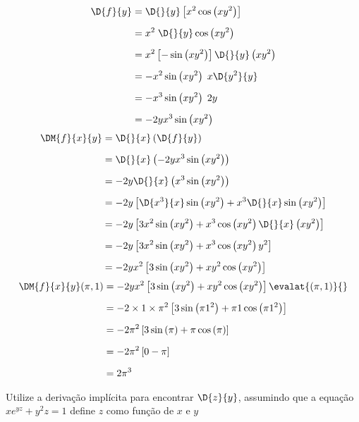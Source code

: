 \documentclass[a4paper,12pt,fleqn]{article}
\begin{document}
\begin{answer}
\begin{align*}
  \D{f}{y}
  & = \D{}{y} \left[x^2\cos\left(xy^2\right)\right]\\[2mm]
  & = x^2 \; \D{}{y} \cos\left(xy^2\right)\\[2mm]
  & = x^2 \left[-\sin\left(xy^2\right)\right] \D{}{y}\left(xy^2\right) \\[2mm]
  & = -x^2 \sin\left(xy^2\right) \;x \D{y^2}{y} \\[2mm]
  & = -x^3 \sin\left(xy^2\right) \;2y \\[2mm]
  & = -2y x^3 \sin\left(xy^2\right)
\end{align*}
\begin{align*}
  \DM{f}{x}{y}
  & = \D{}{x}\left(\D{f}{y}\right) \\[2mm]
  & = \D{}{x}\left(-2y x^3 \sin\left(xy^2\right)\right) \\[2mm]
  & = -2y \D{}{x}\left(x^3 \sin\left(xy^2\right)\right) \\[2mm]
  & = -2y
      \left[
        \D{x^3}{x} \sin\left(xy^2\right) +
        x^3 \D{}{x}\sin\left(xy^2\right)
      \right] \\[2mm]
  & = -2y
      \left[
        3x^2 \sin\left(xy^2\right) +
        x^3 \cos\left(xy^2\right) \D{}{x}\left(xy^2\right)
      \right] \\[2mm]
  & = -2y
      \left[
        3x^2 \sin\left(xy^2\right) +
        x^3 \cos\left(xy^2\right) y^2
      \right] \\[2mm]
  & = -2yx^2
      \left[
        3    \sin\left(xy^2\right) +
        xy^2 \cos\left(xy^2\right)
      \right]
\end{align*}
\begin{align*}
  \DM{f}{x}{y}(\pi, 1)
  & = -2yx^2
      \left[
        3    \sin\left(xy^2\right) +
        xy^2 \cos\left(xy^2\right)
      \right] \evalat{(\pi, 1)}{} \\[2mm]
  & = -2 \times 1 \times \pi^2
      \left[
        3    \sin\left(\pi 1^2\right) +
        \pi 1 \cos\left(\pi 1^2\right)
      \right] \\[2mm]
  & = -2\pi^2
      \left[
        3   \sin\left(\pi\right) +
        \pi \cos\left(\pi\right)
      \right] \\[2mm]
  & = -2\pi^2 \left[ 0 - \pi \right] \\[2mm]
  & = 2\pi^3
\end{align*}
\end{answer}

Utilize a derivação implícita para encontrar \(\D{z}{y}\), assumindo que a equação
\;$
   x e^{yz} + y^2z = 1
$
define $z$ como função de $x$ e $y$
\end{document}
